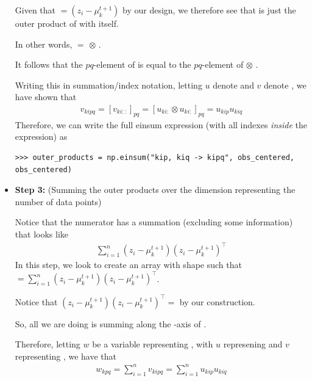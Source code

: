 \begin{itemize}
Given that  $= (z_i - \mu_k^{t+1})$ by our design, we therefore see that \newline
{} is just the outer product of  with itself.

In other words,  \newline {} $=$   $\otimes$ .

It follows that the $pq$-element of   is equal to the $pq$-element of  $\otimes$ .

Writing this in summation/index notation, letting $u$ denote  and $v$ denote \newline {}, we have shown that
\begin{align*}
v_{kipq} = [v_{ki::}]_{pq} = [u_{ki:} \otimes u_{ki:}]_{pq} = u_{kip} u_{kiq}
\end{align*}
Therefore, we can write the full einsum expression (with all indexes \emph{inside} the expression) as
\begin{lstlisting}
>>> outer_products = np.einsum("kip, kiq -> kipq", obs_centered, obs_centered)
\end{lstlisting}


\item \textbf{Step 3:} (Summing the outer products over the dimension representing the number of data points)

Notice that the numerator has a summation (excluding some information) that looks like
\begin{align*}
	\sum_{i=1}^{n} (z_i - \mu_k^{t+1}) (z_i - \mu_k^{t+1})^\top
\end{align*}
In this step, we look to create an array  with shape  such that \newline {} $ = \sum_{i=1}^{n} (z_i - \mu_k^{t+1}) (z_i - \mu_k^{t+1})^\top$.

Notice that $(z_i - \mu_k^{t+1}) (z_i - \mu_k^{t+1})^\top = $  by our construction.

So, all we are doing is summing along the -axis of .

Therefore, letting $w$ be a variable representing , with $u$ represening  and $v$ representing , we have that
\begin{align*}
w_{kpq} = \sum_{i=1}^{n} v_{kipq} = \sum_{i=1}^{n} u_{kip} u_{kiq}
\end{align*}


\end{itemize}
